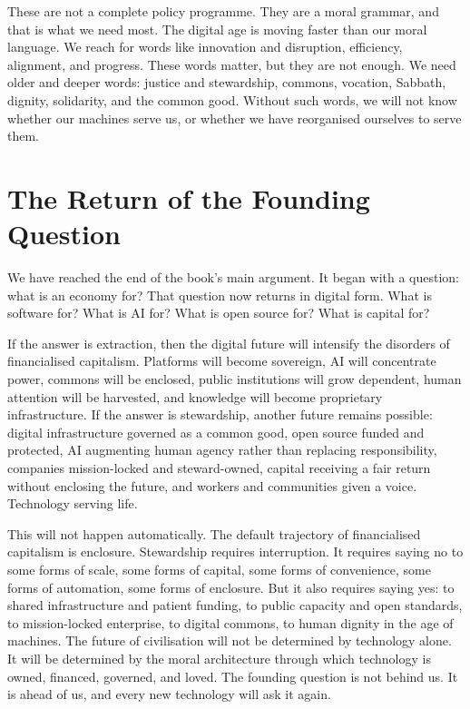 \documentclass[11pt,a4paper,oneside]{book}
\begin{document}
These are not a complete policy programme. They are a moral grammar, and that is what we need most. The digital age is moving faster than our moral language. We reach for words like innovation and disruption, efficiency, alignment, and progress. These words matter, but they are not enough. We need older and deeper words: justice and stewardship, commons, vocation, Sabbath, dignity, solidarity, and the common good. Without such words, we will not know whether our machines serve us, or whether we have reorganised ourselves to serve them.

\section*{The Return of the Founding Question}

We have reached the end of the book's main argument. It began with a question: what is an economy for? That question now returns in digital form. What is software for? What is AI for? What is open source for? What is capital for?

If the answer is extraction, then the digital future will intensify the disorders of financialised capitalism. Platforms will become sovereign, AI will concentrate power, commons will be enclosed, public institutions will grow dependent, human attention will be harvested, and knowledge will become proprietary infrastructure. If the answer is stewardship, another future remains possible: digital infrastructure governed as a common good, open source funded and protected, AI augmenting human agency rather than replacing responsibility, companies mission-locked and steward-owned, capital receiving a fair return without enclosing the future, and workers and communities given a voice. Technology serving life.

This will not happen automatically. The default trajectory of financialised capitalism is enclosure. Stewardship requires interruption. It requires saying no to some forms of scale, some forms of capital, some forms of convenience, some forms of automation, some forms of enclosure. But it also requires saying yes: to shared infrastructure and patient funding, to public capacity and open standards, to mission-locked enterprise, to digital commons, to human dignity in the age of machines. The future of civilisation will not be determined by technology alone. It will be determined by the moral architecture through which technology is owned, financed, governed, and loved. The founding question is not behind us. It is ahead of us, and every new technology will ask it again.
\end{document}
